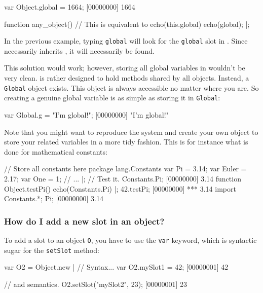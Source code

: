 \begin{urbiscript}
var Object.global = 1664;
[00000000] 1664

function any_object()
{
  // This is equivalent to echo(this.global)
  echo(global);
}|;
\end{urbiscript}

In the previous example, typing \lstinline|global| will look for the
\lstinline|global| slot in \this. Since \this necessarily inherits
, it will necessarily be found.

This solution would work; however, storing all global variables in
 wouldn't be very clean.  is rather
designed to hold methods shared by all objects. Instead, a
\lstinline|Global| object exists. This object is always accessible no matter
where you are.
So creating a genuine global variable is as simple as storing it in
\lstinline|Global|:

\begin{urbiscript}
var Global.g = "I'm global!";
[00000000] "I'm global!"
\end{urbiscript}

Note that you might want to reproduce the  system and
create your own object to store your related variables in a more tidy
fashion. This is for instance what is done for mathematical constants:

\begin{urbiscript}
// Store all constants here
package lang.Constants
{
  var Pi = 3.14;
  var Euler = 2.17;
  var One = 1;
  // ...
}|;
// Test it.
Constants.Pi;
[00000000] 3.14
function Object.testPi() { echo(Constants.Pi) }|;
42.testPi;
[00000000] *** 3.14
import Constants.*;
Pi;
[00000000] 3.14
\end{urbiscript}

\subsubsection{How do I add a new slot in an object?}
To add a slot to an object \lstinline{O}, you have to use the
\lstinline{var} keyword, which is syntactic sugar for the
\lstinline{setSlot} method:

\begin{urbiscript}
var O2 = Object.new |
// Syntax...
var O2.mySlot1 = 42;
[00000001] 42

// and semantics.
O2.setSlot("mySlot2", 23);
[00000001] 23
\end{urbiscript}

